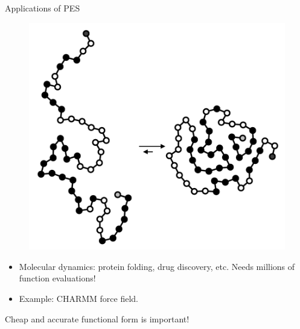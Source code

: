 \documentclass{beamer}
\begin{document}
\begin{frame}{Applications of PES}
    \begin{figure}[htbp]
        \centering
        \includegraphics[scale=0.15]{img/slide/Protein_folding_schematic.png}
        \label{fig:pes}
    \end{figure}
    \begin{itemize}
        \item Molecular dynamics: protein folding, drug discovery, etc. Needs millions of function evaluations!
        \item Example: CHARMM force field.
    \end{itemize}
    Cheap and accurate functional form is important!
\end{frame}
\end{document}
